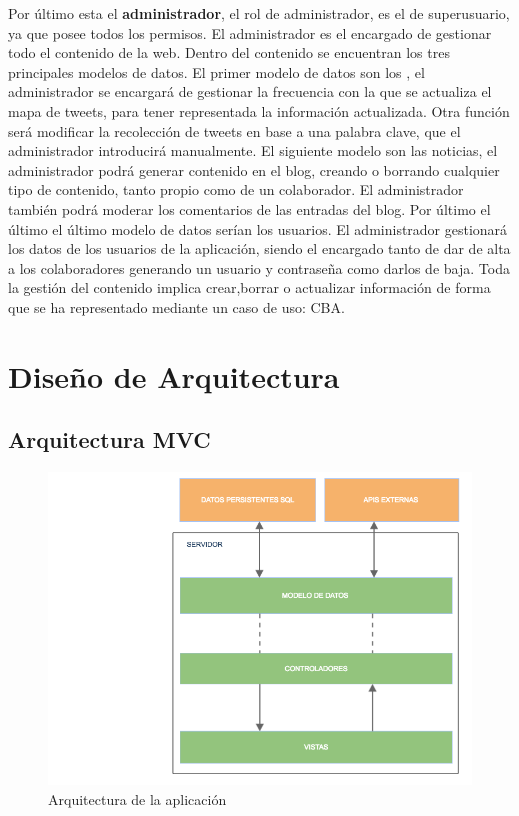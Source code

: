 \vspace{5 mm}

Por último esta el \textbf{administrador}, el rol de administrador, es el de superusuario, ya que posee todos los permisos. El administrador es el encargado de gestionar todo el contenido de la web. Dentro del contenido se encuentran los tres principales modelos de datos. El primer modelo de datos son los , el administrador se encargará de gestionar la frecuencia con la que se actualiza el mapa de tweets, para tener representada la información actualizada. Otra función será modificar la recolección de tweets en base a una palabra clave, que el administrador introducirá manualmente. El siguiente modelo son las noticias, el administrador podrá generar contenido en el blog, creando o borrando cualquier tipo de contenido, tanto propio como de un colaborador. El administrador también podrá moderar los comentarios de las entradas del blog. Por último el último el último modelo de datos serían los usuarios. El administrador gestionará los datos de los usuarios de la aplicación, siendo el encargado tanto de dar de alta a los colaboradores generando un usuario y contraseña como darlos de baja. Toda la gestión del contenido implica crear,borrar o actualizar información de forma que se ha representado mediante un caso de uso: CBA.


\section{Diseño de Arquitectura}

\subsection{Arquitectura MVC}

\begin{figure}
\begin{center}
\includegraphics[width=1.0\textwidth]{imagenes/arquitectura.png}
\caption{Arquitectura de la aplicación}
\label{arquitectura}
\end{center}
\end{figure}



